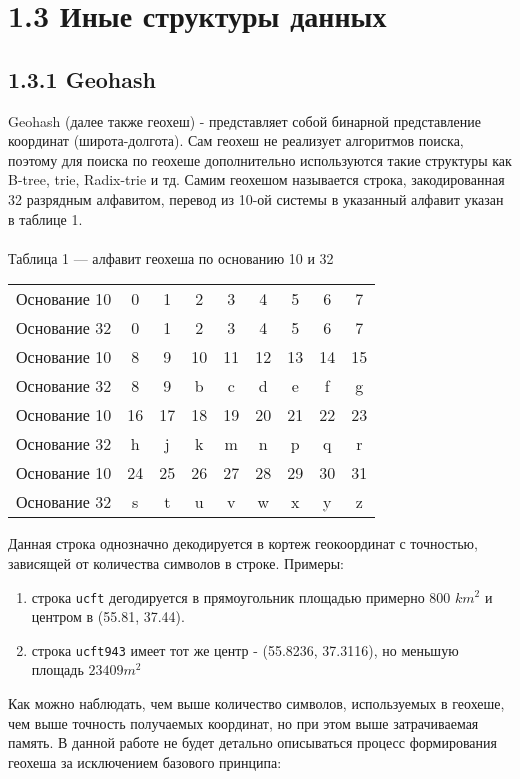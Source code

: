 \section{1.3 Иные структуры данных}

\subsection{1.3.1 Geohash}
Geohash (далее также геохеш) - представляет собой бинарной представление координат (широта-долгота)\cite{jiajunGeohash}. Сам геохеш не реализует алгоритмов поиска, поэтому для поиска по геохеше дополнительно используются такие структуры как B-tree, trie, Radix-trie и тд\cite{sahrIndexingSystems}.
Самим геохешом называется строка, закодированная 32 разрядным алфавитом, перевод из 10-ой системы в указанный алфавит указан в таблице 1.
  \\
  \\
Таблица 1 --- алфавит геохеша по основанию 10 и 32
\begin{center}
\begin{tabular}{ c|c c c c c c c c }
 Основание 10 & 0 & 1 & 2 & 3 & 4 & 5 & 6 & 7 \\
 Основание 32 & 0 & 1 & 2 & 3 & 4 & 5 & 6 & 7 \\
  \hline\hline
 Основание 10 & 8 & 9 & 10 & 11 & 12 & 13 & 14 & 15 \\
 Основание 32 & 8 & 9 & b & c & d & e & f & g \\
  \hline\hline
 Основание 10 & 16 & 17 & 18 & 19 & 20 & 21 & 22 & 23  \\
 Основание 32 & h & j & k & m & n & p & q & r \\
  \hline\hline
 Основание 10 & 24 & 25 & 26 & 27 & 28 & 29 & 30 & 31 \\
 Основание 32 & s & t & u & v & w & x & y & z \\
\end{tabular}
\end{center}
\begingroup
\raggedleft
\vspace{10mm}
Данная строка однозначно декодируется в кортеж геокоординат с точностью, зависящей от количества символов в строке. Примеры:
\endgroup
\begin{enumerate}
    \item строка \texttt{ucft} дегодируется в прямоугольник площадью примерно 800 $ km^2 $ и центром в (55.81, 37.44).
    \item строка \texttt{ucft943} имеет тот же центр - (55.8236, 37.3116), но меньшую площадь $23409 m^2$
\end{enumerate}
Как можно наблюдать, чем выше количество символов, используемых в геохеше, чем выше точность получаемых координат, но при этом выше затрачиваемая память\cite{sidorovGeohash}.
В данной работе не будет детально описываться процесс формирования геохеша за исключением базового принципа: 

